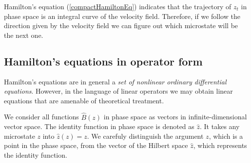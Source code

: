 \documentclass[b5paper,openright,10pt]{book}
\begin{document}
Hamilton's equation (\ref{compactHamiltonEq}) indicates that the trajectory of $z_t$ in phase space is an integral curve of the velocity field. Therefore, if we follow the direction given by the velocity field we can figure out which microstate will be the next one. 


\subsection{Hamilton's equations in operator form}
Hamilton's equations are in general a {\it set of nonlinear ordinary differential equations}. However, in the language of linear operators we may obtain linear equations that are amenable of theoretical treatment. 

We consider all functions $\hat{B}(z)$ in phase space as vectors in infinite-dimensional vector space. 
The identity function in phase space is denoted as $\hat{z}$. It takes any microstate $z$ into $\hat{z}(z)=z$. 
We carefuly distinguish the argument $z$, which is a point in the phase space, from the vector of the Hilbert space $\hat{z}$, which represents the identity function.
\end{document}
